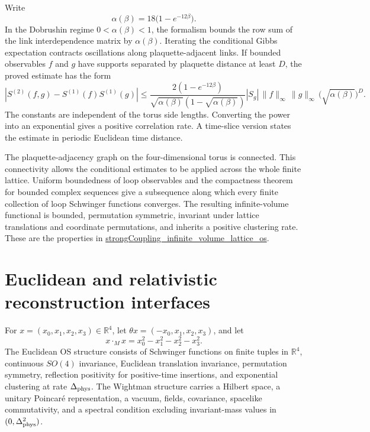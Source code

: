 \documentclass[11pt]{article}
\numberwithin{equation}{section}
\newcommand{\Sch}{S}
\newcommand{\R}{\mathbb{R}}
\newcommand{\Lean}[1]{\url{#1}}
\begin{document}
Write
\[
  \alpha(\beta)=18\bigl(1-e^{-12\beta}\bigr).
\]
In the Dobrushin regime \(0<\alpha(\beta)<1\), the formalism bounds the row sum of the link interdependence matrix by \(\alpha(\beta)\). Iterating the conditional Gibbs expectation contracts oscillations along plaquette-adjacent links. If bounded observables \(f\) and \(g\) have supports separated by plaquette distance at least \(D\), the proved estimate has the form
\[
 \left|\Sch^{(2)}(f,g)-\Sch^{(1)}(f)\Sch^{(1)}(g)\right|
 \leq
 \frac{2(1-e^{-12\beta})}
      {\sqrt{\alpha(\beta)}(1-\sqrt{\alpha(\beta)})}
 |S_g|\,\|f\|_\infty\,\|g\|_\infty\,
 \bigl(\sqrt{\alpha(\beta)}\bigr)^D.
\]
The constants are independent of the torus side lengths. Converting the power into an exponential gives a positive correlation rate. A time-slice version states the estimate in periodic Euclidean time distance.

The plaquette-adjacency graph on the four-dimensional torus is connected. This connectivity allows the conditional estimates to be applied across the whole finite lattice. Uniform boundedness of loop observables and the compactness theorem for bounded complex sequences give a subsequence along which every finite collection of loop Schwinger functions converges. The resulting infinite-volume functional is bounded, permutation symmetric, invariant under lattice translations and coordinate permutations, and inherits a positive clustering rate. These are the properties in \Lean{strongCoupling_infinite_volume_lattice_os}.

\section{Euclidean and relativistic reconstruction interfaces}

For \(x=(x_0,x_1,x_2,x_3)\in\R^4\), let \(\theta x=(-x_0,x_1,x_2,x_3)\), and let
\[
  x\cdot_M x=x_0^2-x_1^2-x_2^2-x_3^2.
\]
The Euclidean OS structure consists of Schwinger functions on finite tuples in \(\R^4\), continuous \(SO(4)\) invariance, Euclidean translation invariance, permutation symmetry, reflection positivity for positive-time insertions, and exponential clustering at rate \(\Delta_{\rm phys}\). The Wightman structure carries a Hilbert space, a unitary Poincar\'e representation, a vacuum, fields, covariance, spacelike commutativity, and a spectral condition excluding invariant-mass values in \((0,\Delta_{\rm phys}^2)\).
\end{document}
